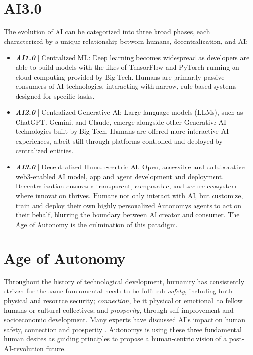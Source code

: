 \documentclass[conference]{IEEEtran}
\begin{document}
\section{AI3.0}

The evolution of AI can be categorized into three broad phases, each characterized by a unique relationship between humans, decentralization, and AI:
\begin{itemize}
    \item \textit{\textbf{AI1.0}} | Centralized ML: Deep learning becomes widespread as developers are able to build models with the likes of TensorFlow and PyTorch running on cloud computing provided by Big Tech. Humans are primarily passive consumers of AI technologies, interacting with narrow, rule-based systems designed for specific tasks.
    \item \textit{\textbf{AI2.0}} | Centralized Generative AI: Large language models (LLMs), such as ChatGPT, Gemini, and Claude, emerge alongside other Generative AI technologies built by Big Tech. Humans are offered more interactive AI experiences, albeit still through platforms controlled and deployed by centralized entities.
    \item \textit{\textbf{AI3.0}} | Decentralized Human-centric AI: Open, accessible and collaborative web3-enabled AI model, app and agent development and deployment. Decentralization ensures a transparent, composable, and secure ecosystem where innovation thrives. Humans not only interact with AI, but customize, train and deploy their own highly personalized Autonomys agents to act on their behalf, blurring the boundary between AI creator and consumer. The Age of Autonomy is the culmination of this paradigm.
    \end{itemize} 

\section{Age of Autonomy}

Throughout the history of technological development, humanity has consistently striven for the same fundamental needs to be fulfilled: \textit{safety}, including both physical and resource security; \textit{connection}, be it physical or emotional, to fellow humans or cultural collectives; and \textit{prosperity}, through self-improvement and socioeconomic development. Many experts have discussed AI's impact on human safety, connection and prosperity \cite{brynjolfsson2014} \cite{russell2019} \cite{miessler}. Autonomys is using these three fundamental human desires as guiding principles to propose a human-centric vision of a post-AI-revolution future.
\end{document}
